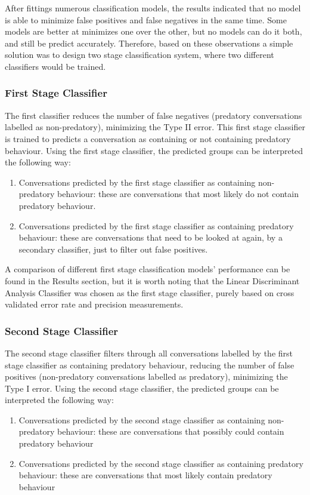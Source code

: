 \documentclass[11pt]{article}
\begin{document}
After fittings numerous classification models, the results indicated that no model is able to minimize false positives and false negatives in the same time. Some models are better at minimizes one over the other, but no models can do it both, and still be predict accurately. Therefore, based on these observations a simple solution was to design two stage classification system, where two different classifiers would be trained.

\subsubsection{First Stage Classifier}
The first classifier reduces the number of false negatives (predatory conversations labelled as non-predatory), minimizing the Type II error.
This first stage classifier is trained to predicts a conversation as containing or not containing predatory behaviour. Using the first stage classifier, the predicted groups can be interpreted the following way: 
\begin{enumerate}
    \item Conversations predicted by the first stage classifier as containing non-predatory behaviour: these are conversations that most likely do not contain predatory behaviour.
    \item Conversations predicted by the first stage classifier as containing predatory behaviour: these are conversations that need to be looked at again, by a secondary classifier, just to filter out false positives.
\end{enumerate}

A comparison of different first stage classification models' performance can be found in the Results section, but it is worth noting that the Linear Discriminant Analysis Classifier was chosen as the first stage classifier, purely based on cross validated error rate and precision measurements.

\subsubsection{Second Stage Classifier}
The second stage classifier filters through all conversations labelled by the first stage classifier as containing predatory behaviour, reducing the number of false positives (non-predatory conversations labelled as predatory), minimizing the Type I error. Using the second stage classifier, the predicted groups can be interpreted the following way: 
\begin{enumerate}
    \item Conversations predicted by the second stage classifier as containing non-predatory behaviour: these are conversations that possibly could contain predatory behaviour
    \item Conversations predicted by the second stage classifier as containing predatory behaviour: these are conversations that most likely contain predatory behaviour
\end{enumerate}
\end{document}
